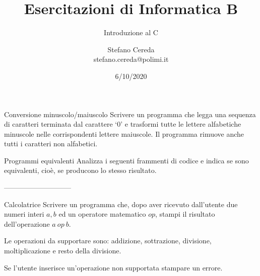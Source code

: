 \documentclass[aspectratio=169]{beamer}
\title{Esercitazioni di Informatica B}
\subtitle{Introduzione al C}
\author{Stefano Cereda\\
		stefano.cereda@polimi.it
	}
\date{6/10/2020}
\institute[PoliMi]{Politecnico Milano}
\begin{document}
\begin{frame}
	\maketitle
\end{frame}


\begin{frame}{Conversione minuscolo/maiuscolo}
    Scrivere un programma che legga una sequenza di caratteri terminata dal carattere `0' e trasformi tutte le lettere
    alfabetiche minuscole nelle corrispondenti lettere maiuscole. Il programma rimuove anche tutti i caratteri non
    alfabetici.
\end{frame}

\begin{frame}{Programmi equivalenti}
Analizza i seguenti frammenti di codice e indica se sono equivalenti, cioè, se producono lo stesso risultato.


-----------------------------

\end{frame}


\begin{frame}{Calcolatrice}
    Scrivere un programma che, dopo aver ricevuto dall'utente due numeri interi $a, b$ ed un operatore matematico $op$,
    stampi il risultato dell'operazione $a \ op \  b$.

    Le operazioni da supportare sono: addizione, sottrazione, divisione, moltiplicazione e resto della divisione.

    Se l'utente inserisce un'operazione non supportata stampare un errore.
\end{frame}
\end{document}
